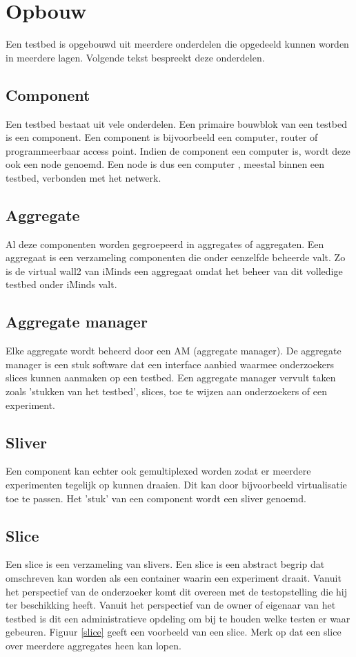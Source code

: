 \section{Opbouw}
Een testbed is opgebouwd uit meerdere onderdelen die opgedeeld kunnen worden in meerdere lagen. Volgende tekst bespreekt deze onderdelen.
\subsection{Component}
\npar
Een testbed bestaat uit vele onderdelen. Een primaire bouwblok van een testbed is een component. Een component is bijvoorbeeld een computer, router of programmeerbaar access point. Indien de component een computer is, wordt deze ook een node genoemd. Een node is dus een computer , meestal binnen een testbed, verbonden met het netwerk. 
\subsection{Aggregate}
\npar
Al deze componenten worden gegroepeerd in aggregates of aggregaten. Een aggregaat is een verzameling componenten die onder eenzelfde beheerde valt. Zo is de virtual wall2 van iMinds een aggregaat omdat het beheer van dit volledige testbed onder iMinds valt.
\clearpage
\subsection{Aggregate manager}
\npar
Elke aggregate wordt beheerd door een AM (aggregate manager). De aggregate manager is een stuk software dat een interface aanbied waarmee onderzoekers slices kunnen aanmaken op een testbed. Een aggregate manager vervult taken zoals 'stukken van het testbed', slices, toe te wijzen aan onderzoekers of een experiment.
\subsection{Sliver}
\npar
Een component kan echter ook gemultiplexed worden zodat er meerdere experimenten tegelijk op kunnen draaien. Dit kan door bijvoorbeeld virtualisatie toe te passen. Het 'stuk' van een component wordt een sliver genoemd.
\subsection{Slice}
\npar
Een slice is een verzameling van slivers. Een slice is een abstract begrip dat omschreven kan worden als een container waarin een experiment draait. Vanuit het perspectief van de onderzoeker komt dit overeen met de testopstelling die hij ter beschikking heeft. Vanuit het perspectief van de owner of eigenaar van het testbed is dit een administratieve opdeling om bij te houden welke testen er waar gebeuren. Figuur \ref{slice} geeft een voorbeeld van een slice. Merk op dat een slice over meerdere aggregates heen kan lopen.
\clearpage
